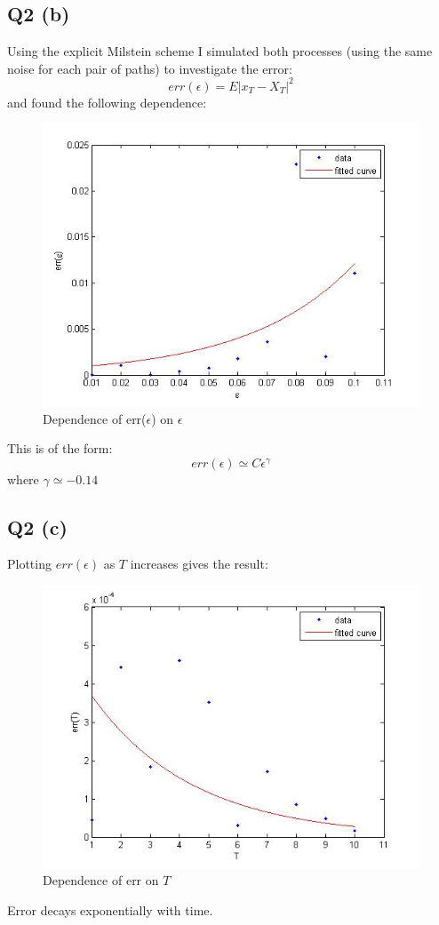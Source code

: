 \documentclass[11pt]{article} %
\begin{document}
\subsection{Q2 (b)}
Using the explicit Milstein scheme I simulated both processes (using the same noise for each pair of paths) to investigate the error:
\[
	err(\epsilon) = E|x_{T} - X_{T}|^{2}
\]
and found the following dependence:
\begin{figure}
	\centering
		\includegraphics[scale = 0.5]{q2_epsilon.jpg}
		\caption{Dependence of err($\epsilon$) on $\epsilon$}
\end{figure}
This is of the form:
\[
err(\epsilon) \simeq C\epsilon^{\gamma}
\]
where $\gamma \simeq -0.14$
\subsection{Q2 (c)}
Plotting $err(\epsilon)$ as $T$ increases gives the result:
\begin{figure}
	\centering
		\includegraphics[scale = 0.5]{q2_T.jpg}
		\caption{Dependence of err on $T$}
\end{figure}
Error decays exponentially with time.
\end{document}
